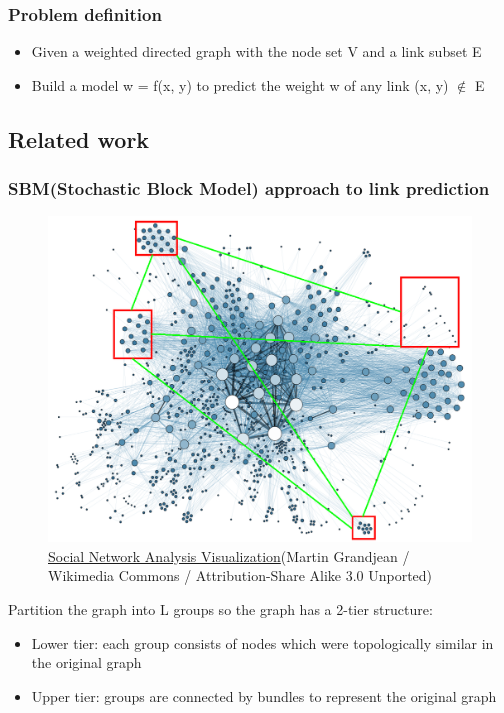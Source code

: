 \documentclass{article}
\begin{document}
\begin{landscape}
\subsubsection{Problem definition}
\begin{itemize}
	\item Given a weighted directed graph with the node set V and a link subset E
	\item Build a model w = f(x, y) to predict the weight w of any link (x, y) $ \notin $ E
\end{itemize}

\subsection{Related work}

\subsubsection{SBM(Stochastic Block Model) approach to link prediction}
\begin{figure}[H]
	\centering
	\includegraphics[width=0.8\linewidth]{SBM}
	\caption{ \href{https://commons.wikimedia.org/wiki/File:Social_Network_Analysis_Visualization.png}{Social Network Analysis Visualization}(Martin Grandjean / Wikimedia Commons / Attribution-Share Alike 3.0 Unported)}
	\label{fig:SBM}
\end{figure}
Partition the graph into L groups so the graph has a 2-tier structure:
\begin{itemize}
	\item Lower tier: each group consists of nodes which were topologically similar in the original graph
	\item Upper tier: groups are connected by bundles to represent the original graph

\end{itemize}
\end{landscape}
\end{document}
